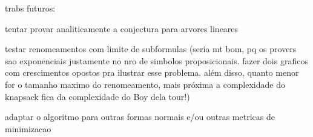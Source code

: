 
\label{cap_conclusoes}

trabs futuros:

tentar provar analiticamente a conjectura para arvores lineares

testar renomeamentos com limite de subformulas (seria mt bom, pq os provers sao exponenciais justamente no nro de simbolos proposicionais. fazer dois graficos com crescimentos opostos pra ilustrar esse problema. além disso, quanto menor for o tamanho maximo do renomeamento, mais próxima a complexidade do knapsack fica da complexidade do Boy dela tour!)

adaptar o algoritmo para outras formas normais e/ou outras metricas de minimizacao
